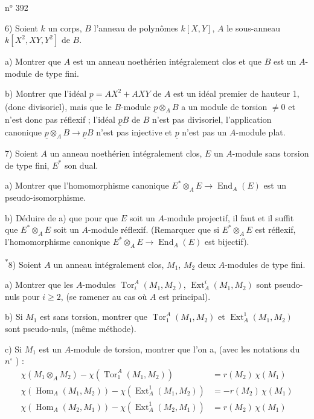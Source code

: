 \hfill n° 392

6) Soient $k$ un corps, $B$ l'anneau de polynômes $k[X,Y]$, $A$ le sous-anneau $k[X^2,XY,Y^2]$ de $B$.

a) Montrer que $A$ est un anneau noethérien intégralement clos et que $B$ est un $A$-module de type fini.

b) Montrer que l'idéal $\underline{p}=AX^2+AXY$ de $A$ est un idéal premier de hauteur 1, (donc divisoriel), mais que le $B$-module $\underline{p}\otimes_A B$ a un module de torsion $\ne 0$ et n'est donc pas réflexif ; l'idéal $\underline{p} B$ de $B$ n'est pas divisoriel, l'application canonique $\underline{p}\otimes_A B\longrightarrow \underline{p} B$ n'est pas injective et $\underline{p}$ n'est pas un $A$-module plat.

7) Soient $A$ un anneau noethérien intégralement clos, $E$ un $A$-module sans torsion de type fini, $E^*$ son dual.

a) Montrer que l'homomorphisme canonique $E^*\otimes_A E\longrightarrow\operatorname{End}_A(E)$ est un pseudo-isomorphisme.

b) Déduire de a) que pour que $E$ soit un $A$-module projectif, il faut et il suffit que $E^*\otimes_A E$ soit un $A$-module réflexif. (Remarquer que si $E^*\otimes_A E$ est réflexif, l'homomorphisme canonique $E^*\otimes_A E\longrightarrow\operatorname{End}_A(E)$ est bijectif).

\textsuperscript{*}8) Soient $A$ un anneau  intégralement clos, $M_1$, $M_2$ deux $A$-modules de type fini.

a) Montrer que les $A$-modules $\operatorname{Tor}_i^A(M_1,M_2)$, $\operatorname{Ext}_A^i(M_1,M_2)$ sont pseudo-nuls pour $i\geq2$, (se ramener au cas où $A$ est principal).

b) Si $M_1$ est sans torsion, montrer que $\operatorname{Tor}_1^A(M_1,M_2)$ et $\operatorname{Ext}_A^1(M_1,M_2)$ sont pseudo-nuls, (même méthode).

c) Si $M_1$ est un $A$-module de torsion, montrer que l'on a, (avec les notations du $n^{\circ}$ \quad) :
\[
\begin{aligned}
\chi(M_1\otimes_A M_2)-\chi(\operatorname{Tor}_1^A(M_1,M_2))&=r(M_2)\,\chi(M_1)\\
\chi(\operatorname{Hom}_A(M_1,M_2))-\chi(\operatorname{Ext}_A^1(M_1,M_2))&=-r(M_2)\,\chi(M_1)\\
\chi(\operatorname{Hom}_A(M_2,M_1))-\chi(\operatorname{Ext}_A^1(M_2,M_1))&=r(M_2)\,\chi(M_1)
\end{aligned}
\]

